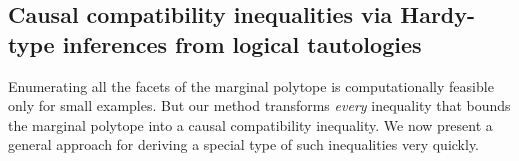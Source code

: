 {%







\subsection{Causal compatibility inequalities via Hardy-type inferences from logical tautologies}\label{sec:TSEM}


Enumerating all the facets of the marginal polytope is computationally feasible only for small examples. But our method transforms \emph{every} inequality that bounds the marginal polytope into a causal compatibility inequality. We now present a general approach for deriving a special type of such inequalities very quickly.

}
